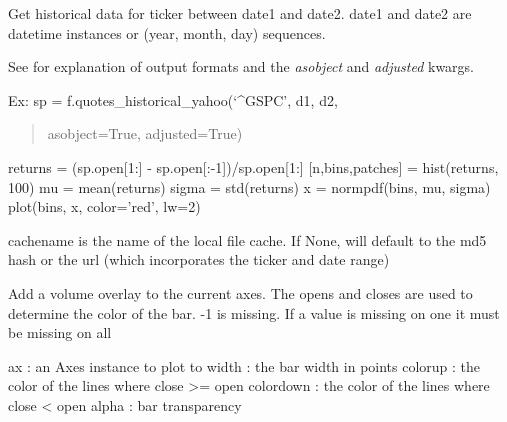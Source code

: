 \documentclass[letterpaper,10pt,english]{sphinxmanual}
\begin{document}
\begin{fulllineitems}
\label{newfinance:newfinance.quotes_historical_yahoo}
Get historical data for ticker between date1 and date2.  date1 and
date2 are datetime instances or (year, month, day) sequences.

See {\hyperref[newfinance:newfinance.parse_yahoo_historical]{}} for explanation of output formats
and the \emph{asobject} and \emph{adjusted} kwargs.

Ex:
sp = f.quotes\_historical\_yahoo(`\textasciicircum{}GSPC', d1, d2,
\begin{quote}

asobject=True, adjusted=True)
\end{quote}

returns = (sp.open{[}1:{]} - sp.open{[}:-1{]})/sp.open{[}1:{]}
{[}n,bins,patches{]} = hist(returns, 100)
mu = mean(returns)
sigma = std(returns)
x = normpdf(bins, mu, sigma)
plot(bins, x, color='red', lw=2)

cachename is the name of the local file cache.  If None, will
default to the md5 hash or the url (which incorporates the ticker
and date range)

\end{fulllineitems}


\begin{fulllineitems}
\label{newfinance:newfinance.volume_overlay}
Add a volume overlay to the current axes.  The opens and closes
are used to determine the color of the bar.  -1 is missing.  If a
value is missing on one it must be missing on all

ax          : an Axes instance to plot to
width       : the bar width in points
colorup     : the color of the lines where close \textgreater{}= open
colordown   : the color of the lines where close \textless{}  open
alpha       : bar transparency

\end{fulllineitems}

\end{document}
